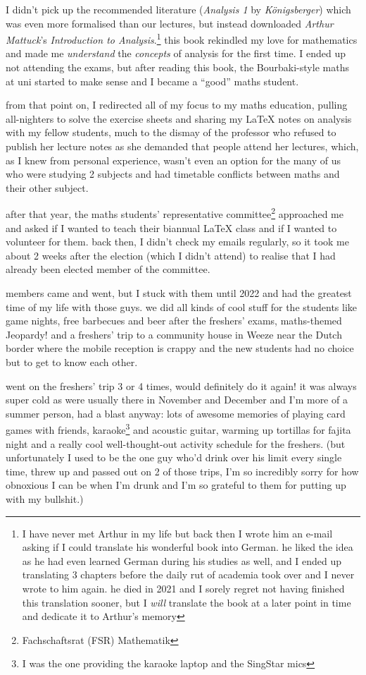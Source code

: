 \documentclass[12pt]{report}
\theoremstyle{definition}
\theoremstyle{remark}
\begin{document}
I didn't pick up the recommended literature (\emph{Analysis 1} by \emph{Königsberger}) which was even more formalised than our lectures, but instead downloaded \emph{Arthur Mattuck}'s \emph{Introduction to Analysis}.\footnote{I have never met Arthur in my life but back then I wrote him an e-mail asking if I could translate his wonderful book into German. he liked the idea as he had even learned German during his studies as well, and I ended up translating 3 chapters before the daily rut of academia took over and I never wrote to him again. he died in 2021 and I sorely regret not having finished this translation sooner, but I \emph{will} translate the book at a later point in time and dedicate it to Arthur's memory} this book rekindled my love for mathematics and made me \emph{understand} the \emph{concepts} of analysis for the first time. I ended up not attending the exams, but after reading this book, the Bourbaki-style maths at uni started to make sense and I became a ``good'' maths student.

from that point on, I redirected all of my focus to my maths education, pulling all-nighters to solve the exercise sheets and sharing my {\LaTeX} notes on analysis with my fellow students, much to the dismay of the professor who refused to publish her lecture notes as she demanded that people attend her lectures, which, as I knew from personal experience, wasn't even an option for the many of us who were studying 2 subjects and had timetable conflicts between maths and their other subject.

after that year, the maths students' representative committee\footnote{Fachschaftsrat (FSR) Mathematik} approached me and asked if I wanted to teach their biannual {\LaTeX} class and if I wanted to volunteer for them. back then, I didn't check my emails regularly, so it took me about 2 weeks after the election (which I didn't attend) to realise that I had already been elected member of the committee.

members came and went, but I stuck with them until 2022 and had the greatest time of my life with those guys. we did all kinds of cool stuff for the students like game nights, free barbecues and beer after the freshers' exams, maths-themed Jeopardy! and a freshers' trip to a community house in Weeze near the Dutch border where the mobile reception is crappy and the new students had no choice but to get to know each other.

went on the freshers' trip 3 or 4 times, would definitely do it again! it was always super cold as were usually there in November and December and I'm more of a summer person, had a blast anyway: lots of awesome memories of playing card games with friends, karaoke\footnote{I was the one providing the karaoke laptop and the SingStar mics} and acoustic guitar, warming up tortillas for fajita night and a really cool well-thought-out activity schedule for the freshers. (but unfortunately I used to be the one guy who'd drink over his limit every single time, threw up and passed out on 2 of those trips, I'm so incredibly sorry for how obnoxious I can be when I'm drunk and I'm so grateful to them for putting up with my bullshit.)
\end{document}

